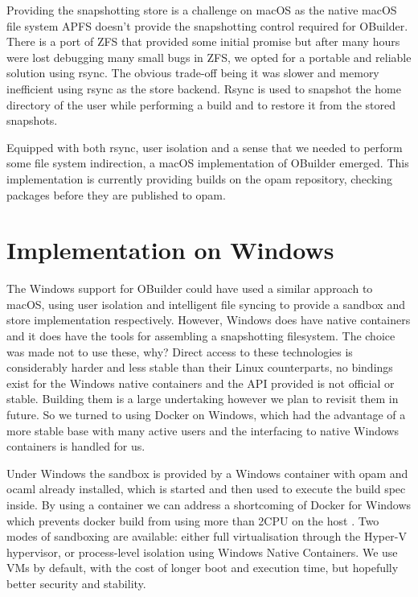 \documentclass[manuscript,screen,sigplan]{acmart}
\begin{document}
Providing the snapshotting store is a challenge on macOS as the native macOS file system APFS doesn’t provide the snapshotting control required for OBuilder. There is a port of ZFS that provided some initial promise but after many hours were lost debugging many small bugs in ZFS, we opted for a portable and reliable solution using rsync. The obvious trade-off being it was slower and memory inefficient using rsync as the store backend. Rsync is used to snapshot the home directory of the user while performing a build and to restore it from the stored snapshots.

Equipped with both rsync, user isolation and a sense that we needed to perform some file system indirection, a macOS implementation of OBuilder emerged. This implementation is currently providing builds on the opam repository, checking packages before they are published to opam.

\section{Implementation on Windows}

The Windows support for OBuilder could have used a similar approach to macOS, using user isolation and intelligent file syncing to provide a sandbox and store implementation respectively. However, Windows does have native containers and it does have the tools for assembling a snapshotting filesystem. The choice was made not to use these, why? Direct access to these technologies is considerably harder and less stable than their Linux counterparts, no bindings exist for the Windows native containers and the API provided is not official or stable. Building them is a large undertaking however we plan to revisit them in future. So we turned to using Docker on Windows, which had the advantage of a more stable base with many active users and the interfacing to native Windows containers is handled for us. 

Under Windows the sandbox is provided by a Windows container with opam and ocaml already installed, which is started and then used to execute the build spec inside. By using a container we can address a shortcoming of Docker for Windows which prevents docker build from using more than 2CPU on the host \cite{2CPUWindows18}. Two modes of sandboxing are available: either full virtualisation through the Hyper-V hypervisor, or process-level isolation using Windows Native Containers. We use VMs by default, with the cost of longer boot and execution time, but hopefully better security and stability.
\end{document}
